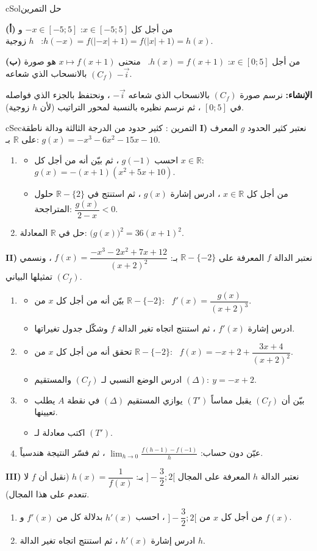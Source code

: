 \documentclass[12pt,a4paper]{article}
\newenvironment{BOX}[2]{\begin{otherlanguage}{english}\begin{arbox}{#1}{#2}}{\end{arbox}\end{otherlanguage}}
\newcounter{exo}
\newenvironment{tamrin}[1]{\stepcounter{exo}\begin{BOX}{cSec}{التمرين \theexo: #1}}{\end{BOX}}
\newenvironment{hal}{\Needspace{12\baselineskip}\begin{otherlanguage}{english}\begin{arbox}[breakable]{cSol}{حل التمرين \theexo}}{\end{arbox}\end{otherlanguage}}
\newcommand{\R}{\mathbb{R}}
\newenvironment{sq}{\begin{itemize}[leftmargin=2.4em,itemsep=3pt]}{\end{itemize}}
\newcommand{\qa}{\item[(أ)]}\newcommand{\qb}{\item[(ب)]}\newcommand{\qc}{\item[(جـ)]}\newcommand{\qd}{\item[(د)]}\newcommand{\qe}{\item[(هـ)]}
\newcommand{\pa}{\par\smallskip\textbf{(أ)} }\newcommand{\pb}{\par\smallskip\textbf{(ب)} }\newcommand{\pc}{\par\smallskip\textbf{(جـ)} }\newcommand{\pd}{\par\smallskip\textbf{(د)} }\newcommand{\pe}{\par\smallskip\textbf{(هـ)} }
\begin{document}
\begin{hal}
 \pa من أجل كل $x\in[-5;5]$: $-x\in[-5;5]$ و $h(-x)=f\big(|-x|+1\big)=f\big(|x|+1\big)=h(x)$: \ $h$ زوجية.
\pb من أجل $x\in[0;5]$: $h(x)=f(x+1)$. \ منحنى $x\mapsto f(x+1)$ هو صورة $(C_f)$ بالانسحاب الذي شعاعه $-\vec i$.\par
\textbf{الإنشاء:} نرسم صورة $(C_f)$ بالانسحاب الذي شعاعه $-\vec i$ ، ونحتفظ بالجزء الذي فواصله في $[0;5]$ ، ثم نرسم نظيره بالنسبة لمحور التراتيب (لأن $h$ زوجية).
\end{hal}

\begin{tamrin}{كثير حدود من الدرجة الثالثة ودالة ناطقة}
\textbf{I)} نعتبر كثير الحدود $g$ المعرف على $\R$ بـ: $g(x)=-x^3-6x^2-15x-10$.
\begin{enumerate}
\item
\begin{sq}
\qa احسب $g(-1)$ ، ثم بيّن أنه من أجل كل $x\in\R$: \ $g(x)=-(x+1)(x^2+5x+10)$.
\qb من أجل كل $x\in\R$ ، ادرس إشارة $g(x)$ ، ثم استنتج في $\R-\{2\}$ حلول المتراجحة: $\dfrac{g(x)}{2-x}<0$.
\end{sq}
\item حل في $\R$ المعادلة: $\big(g(x)\big)^2=36(x+1)^2$.
\end{enumerate}
\textbf{II)} نعتبر الدالة $f$ المعرفة على $\R-\{-2\}$ بـ: $f(x)=\dfrac{-x^3-2x^2+7x+12}{(x+2)^2}$ ، ونسمي $(C_f)$ تمثيلها البياني.
\begin{enumerate}
\item
\begin{sq}
\qa بيّن أنه من أجل كل $x$ من $\R-\{-2\}$: \ $f'(x)=\dfrac{g(x)}{(x+2)^3}$.
\qb ادرس إشارة $f'(x)$ ، ثم استنتج اتجاه تغير الدالة $f$ وشكّل جدول تغيراتها.
\end{sq}
\item
\begin{sq}
\qa تحقق أنه من أجل كل $x$ من $\R-\{-2\}$: \ $f(x)=-x+2+\dfrac{3x+4}{(x+2)^2}$.
\qb ادرس الوضع النسبي لـ $(C_f)$ والمستقيم $(\Delta):\ y=-x+2$.
\end{sq}
\item
\begin{sq}
\qa بيّن أن $(C_f)$ يقبل مماساً $(T')$ يوازي المستقيم $(\Delta)$ في نقطة $A$ يطلب تعيينها.
\qb اكتب معادلة لـ $(T')$.
\end{sq}
\item عيّن دون حساب: $\displaystyle\lim_{h\to0}\frac{f(h-1)-f(-1)}{h}$ ، ثم فسّر النتيجة هندسياً.
\end{enumerate}
\textbf{III)} نعتبر الدالة $h$ المعرفة على المجال $\Big]-\dfrac32;2\Big[$ بـ: $h(x)=\dfrac{1}{f(x)}$ (نقبل أن $f$ لا تنعدم على هذا المجال).
\begin{enumerate}
\item من أجل كل $x$ من $\Big]-\dfrac32;2\Big[$ ، احسب $h'(x)$ بدلالة كل من $f'(x)$ و $f(x)$.
\item ادرس إشارة $h'(x)$ ، ثم استنتج اتجاه تغير الدالة $h$.
\end{enumerate}
\end{tamrin}
\end{document}
